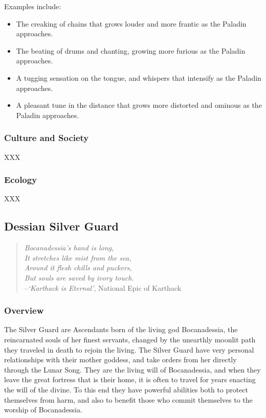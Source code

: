 \documentclass[oneside,11pt,english]{book}
\begin{document}
Examples include:
\begin{itemize}
\item The creaking of chains that grows louder and more frantic as the Paladin approaches. 
\item The beating of drums and chanting, growing more furious as the Paladin approaches. 
\item A tugging sensation on the tongue, and whispers that intensify as the Paladin approaches. 
\item A pleasant tune in the distance that grows more distorted and ominous as the Paladin 
approaches. 
\end{itemize}
\subsubsection*{Culture and Society} 
XXX 
\subsubsection*{Ecology} 
XXX 
\subsection{Dessian Silver Guard}
\begin{verse}
	\emph{Bocanadessia's hand is long,\\
It stretches like mist from the sea,\\
Around it flesh chills and puckers,\\
But souls are saved by ivory touch.}\\

--\textit{‘Karthack is Eternal’}, National Epic of Karthack
\end{verse}
\subsubsection*{Overview}
The Silver Guard are Ascendants born of the living god Bocanadessia, the reincarnated souls of her finest 
servants, changed by the unearthly moonlit path they traveled in death to rejoin the living. The Silver 
Guard have very personal relationships with their mother goddess, and take orders from her directly 
through the Lunar Song. They are the living will of Bocanadessia, and when they leave the great fortress 
that is their home, it is often to travel for years enacting the will of the divine. To this end they have 
powerful abilities both to protect themselves from harm, and also to benefit those who commit themselves 
to the worship of Bocanadessia. 
\end{document}
